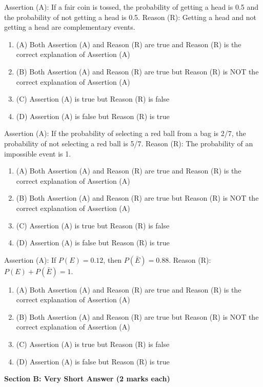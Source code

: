 \documentclass[12pt,a4paper]{exam}
\begin{document}
\begin{questions}
\question[1] Assertion (A): If a fair coin is tossed, the probability of getting a head is 0.5 and the probability of not getting a head is 0.5. Reason (R): Getting a head and not getting a head are complementary events.
\begin{enumerate}[label=(\Alph*)]
  \item (A) Both Assertion (A) and Reason (R) are true and Reason (R) is the correct explanation of Assertion (A)
  \item (B) Both Assertion (A) and Reason (R) are true but Reason (R) is NOT the correct explanation of Assertion (A)
  \item (C) Assertion (A) is true but Reason (R) is false
  \item (D) Assertion (A) is false but Reason (R) is true
\end{enumerate}
\vspace{0.15cm}

\question[1] Assertion (A): If the probability of selecting a red ball from a bag is 2/7, the probability of not selecting a red ball is 5/7. Reason (R): The probability of an impossible event is 1.
\begin{enumerate}[label=(\Alph*)]
  \item (A) Both Assertion (A) and Reason (R) are true and Reason (R) is the correct explanation of Assertion (A)
  \item (B) Both Assertion (A) and Reason (R) are true but Reason (R) is NOT the correct explanation of Assertion (A)
  \item (C) Assertion (A) is true but Reason (R) is false
  \item (D) Assertion (A) is false but Reason (R) is true
\end{enumerate}
\vspace{0.15cm}

\question[1] Assertion (A): If $P(E) = 0.12$, then $P(\bar{E}) = 0.88$. Reason (R): $P(E) + P(\bar{E}) = 1$.
\begin{enumerate}[label=(\Alph*)]
  \item (A) Both Assertion (A) and Reason (R) are true and Reason (R) is the correct explanation of Assertion (A)
  \item (B) Both Assertion (A) and Reason (R) are true but Reason (R) is NOT the correct explanation of Assertion (A)
  \item (C) Assertion (A) is true but Reason (R) is false
  \item (D) Assertion (A) is false but Reason (R) is true
\end{enumerate}
\vspace{0.15cm}

\end{questions}
\bigskip
\noindent\textbf{\large Section B: Very Short Answer (2 marks each)}
\end{document}
